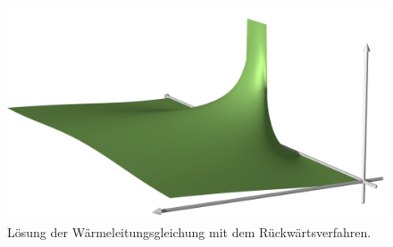 \begin{figure}
\centering
\includegraphics[width=\hsize]{chapters/70-pde/images/implizit.jpg}
\caption{Lösung der Wärmeleitungsgleichung mit dem Rückwärtsverfahren.
\label{buch:pde:waerme:figure:rueckwaerts}}
\end{figure}


